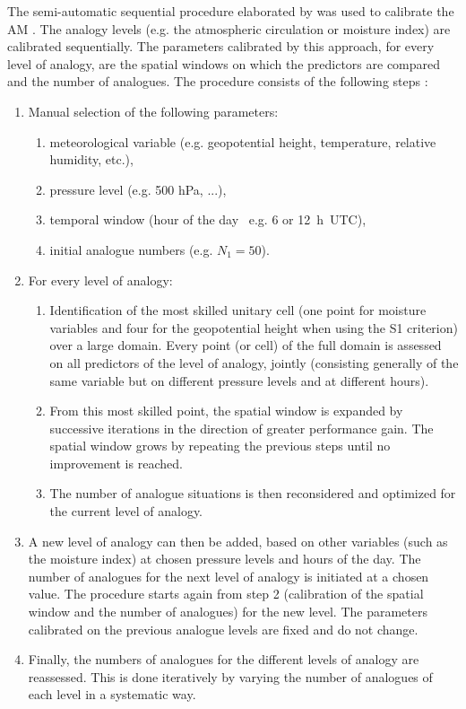 \documentclass[hess, manuscript]{copernicus}
\begin{document}
	The semi-automatic sequential procedure elaborated by \citet{Bontron2004} was used to calibrate the AM \cite[see also ][]{Radanovics2013, BenDaoud2016}. The analogy levels (e.g. the atmospheric circulation or moisture index) are calibrated sequentially. The parameters calibrated by this approach, for every level of analogy, are the spatial windows on which the predictors are compared and the number of analogues. The procedure consists of the following steps \citep{Bontron2004}:
	
	\begin{enumerate}
		\item Manual selection of the following parameters:
		\begin{enumerate}
			\item meteorological variable (e.g. geopotential height, temperature, relative humidity, etc.),
			\item pressure level (e.g. 500 hPa, ...),
			\item temporal window (hour of the day \textendash\ e.g. 6 or 12~h~UTC),
			\item initial analogue numbers (e.g. $N_{1}=50$).
		\end{enumerate}
		
		\item For every level of analogy:
		\begin{enumerate}
			\item Identification of the most skilled unitary cell (one point for moisture variables and four for the geopotential height when using the S1 criterion) over a large domain. Every point (or cell) of the full domain is assessed on all predictors of the level of analogy, jointly (consisting generally of the same variable but on different pressure levels and at different hours).
			\item From this most skilled point, the spatial window is expanded by successive iterations in the direction of greater performance gain. The spatial window grows by repeating the previous steps until no improvement is reached.
			\item The number of analogue situations is then reconsidered and optimized for the current level of analogy.
		\end{enumerate}
		\item A new level of analogy can then be added, based on other variables (such as the moisture index) at chosen pressure levels and hours of the day. The number of analogues for the next level of analogy is initiated at a chosen value. The procedure starts again from step 2 (calibration of the spatial window and the number of analogues) for the new level. The parameters calibrated on the previous analogue levels are fixed and do not change. 
		\item Finally, the numbers of analogues for the different levels of analogy are reassessed. This is done iteratively by varying the number of analogues of each level in a systematic way.
	\end{enumerate}
	
\end{document}
